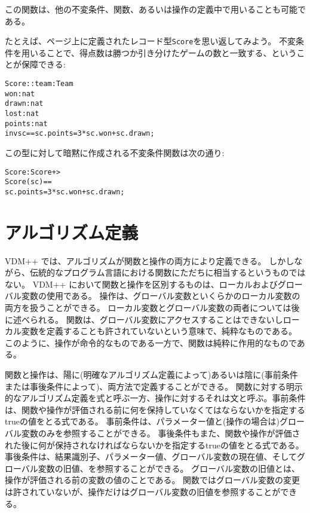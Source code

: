 \documentclass[\pformat,12pt]{jarticle}
\newcommand{\vdmslpp}[2]{%
#2
}
\newcommand{\vdmsl}{VDM-SL}
\newcommand{\vdmpp}{VDM++}
\begin{document}
この関数は、他の不変条件、関数、あるいは操作の定義中で用いることも可能である。

たとえば、\pageref{scoredef}ページ上に定義されたレコード型\texttt{Score}を思い返してみよう。
不変条件を用いることで、得点数は勝つか引き分けたゲームの数と一致する、ということが保障できる:
\begin{alltt}
  Score :: team : Team
           won : nat
           drawn : nat
           lost : nat
           points : nat
  inv sc == sc.points = 3 * sc.won + sc.drawn;
\end{alltt}
この型に対して暗黙に作成される不変条件関数は次の通り:
\begin{alltt}
  Score : Score +> 
  Score (sc) == 
    sc.points = 3 * sc.won + sc.drawn;
\end{alltt}

\section{アルゴリズム定義}
\label{algorithm}


\vdmslpp{\vdmsl}{\vdmpp}では、アルゴリズムが関数と操作の両方により定義できる。 
しかしながら、伝統的なプログラム言語における関数にただちに相当するというものではない。
\vdmslpp{\vdmsl}{\vdmpp}において関数と操作を区別するものは、ローカルおよびグローバル変数の使用である。
操作は、グローバル変数といくらかのローカル変数の両方を扱うことができる。
ローカル変数とグローバル変数の両者については後に述べられる。
関数は、グローバル変数にアクセスすることはできないしローカル変数を定義することも許されていないという意味で、純粋なものである。
このように、操作が命令的なものである一方で、関数は純粋に作用的なものである。

関数と操作は、陽に(明確なアルゴリズム定義によって)あるいは陰に(事前条件または事後条件によって)、両方法で定義することができる。
関数に対する明示的なアルゴリズム定義を式と呼ぶ一方、操作に対するそれは文と呼ぶ。事前条件は、関数や操作が評価される前に何を保持していなくてはならないかを指定するtrueの値をとる式である。
事前条件は、パラメーター値と(操作の場合は)グローバル変数のみを参照することができる。
事後条件もまた、関数や操作が評価された後に何が保持されなければならないかを指定するtrueの値をとる式である。
事後条件は、結果識別子、パラメーター値、グローバル変数の現在値、そしてグローバル変数の旧値、を参照することができる。
グローバル変数の旧値とは、操作が評価される前の変数の値のことである。
関数ではグローバル変数の変更は許されていないが、操作だけはグローバル変数の旧値を参照することができる。
\end{document}
